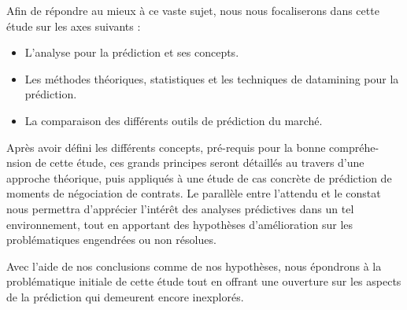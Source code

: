 \documentclass{article}
\begin{document}
Afin de répondre au mieux à ce vaste sujet, nous nous focaliserons dans cette étude sur les axes suivants :

\begin{itemize}
\item L’analyse pour la prédiction et ses concepts.

\item Les méthodes théoriques, statistiques et les techniques de datamining pour la prédiction.

\item La comparaison des différents outils de prédiction du marché.
\end{itemize}

  
Après avoir défini les différents concepts, pré-requis pour la bonne compréhe-nsion de cette étude, ces grands principes seront détaillés au travers d'une  approche théorique, puis appliqués à une étude de cas concrète de prédiction de moments de négociation de contrats. Le parallèle entre l'attendu et le constat nous permettra d’apprécier l’intérêt des analyses prédictives dans un tel environnement, tout en apportant des hypothèses d'amélioration sur les problématiques engendrées ou non résolues.

Avec l’aide de nos conclusions comme de nos hypothèses, nous épondrons à la problématique initiale de cette étude tout en offrant une ouverture sur les aspects de la prédiction qui demeurent encore inexplorés.
\end{document}
